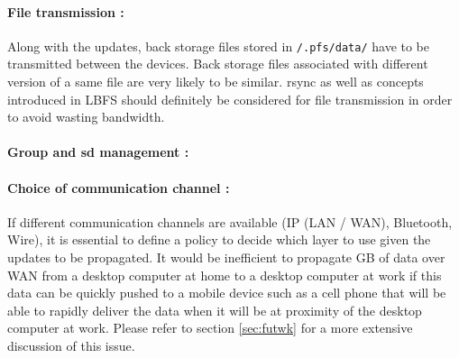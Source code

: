 \paragraph {File transmission :}
Along with the updates, back storage files stored in {\tt /.pfs/data/}
have to be transmitted between the devices. Back storage files
associated with different version of a same file are very likely to be
similar. rsync\cite{tridgell:rsync} as well as concepts introduced in
LBFS\cite{muthitacharoen:lbfs} should definitely be considered for
file transmission in order to avoid wasting bandwidth.

\paragraph {Group and sd management :}

\paragraph {Choice of communication channel :}
If different communication channels are available (IP (LAN / WAN),
Bluetooth, Wire), it is essential to define a policy to decide which
layer to use given the updates to be propagated. It would be
inefficient to propagate GB of data over WAN from a desktop computer
at home to a desktop computer at work if this data can be quickly
pushed to a mobile device such as a cell phone that will be able to
rapidly deliver the data when it will be at proximity of the desktop
computer at work. Please refer to section \ref{sec:futwk} for a more
extensive discussion of this issue.

